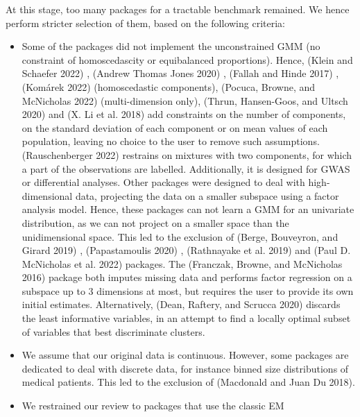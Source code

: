 At this stage, too many packages for a tractable benchmark remained. We
hence perform stricter selection of them, based on the following
criteria:

\begin{itemize}
\item
  Some of the packages did not implement the unconstrained GMM (no
  constraint of homoscedascity or equibalanced proportions). Hence,
   (Klein and Schaefer 2022) , 
  (Andrew Thomas Jones 2020) ,  (Fallah and Hinde 2017) , 
  (Komárek 2022) (homoscedastic components), 
  (Pocuca, Browne, and McNicholas 2022) (multi-dimension only), 
  (Thrun, Hansen-Goos, and Ultsch 2020) and  (X. Li et al. 2018) add
  constraints on the number of components, on the standard deviation
  of each component or on mean values of each population, leaving no
  choice to the user to remove such assumptions. 
  (Rauschenberger 2022) restrains on mixtures with two components, for which a
  part of the observations are labelled. Additionally, it is designed
  for GWAS or differential analyses. Other packages were designed to
  deal with high-dimensional data, projecting the data on a smaller
  subspace using a factor analysis model. Hence, these packages can
  not learn a GMM for an univariate distribution, as we can not
  project on a smaller space than the unidimensional space. This led
  to the exclusion of  (Berge, Bouveyron, and Girard 2019) ,
   (Papastamoulis 2020) ,  (Rathnayake et al. 2019) and
   (Paul D. McNicholas et al. 2022) packages. The 
  (Franczak, Browne, and McNicholas 2016) package both imputes missing data and performs factor
  regression on a subspace up to 3 dimensions at most, but requires
  the user to provide its own initial estimates. \color{green} Alternatively,  (Dean, Raftery, and Scrucca 2020) discards the least informative variables, in an attempt to find a locally optimal subset of variables that best discriminate clusters. \color{black}
\item
  We assume that our original data is continuous. However, some
  packages are dedicated to deal with discrete data, for instance
  binned size distributions of medical patients. This led to the
  exclusion of  (Macdonald and Juan Du 2018).
\item
  We restrained our review to packages that use the classic EM

\end{itemize}
